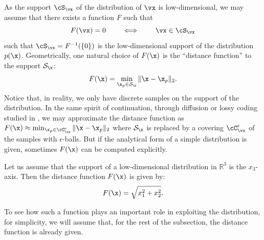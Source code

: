 \documentclass[../../book-main.tex]{subfiles}
\begin{document}
As the support \(\cS_{\vx}\) of the distribution of \(\vx\) is
low-dimensional, we may assume that there exists a function \(F\) such that
\begin{equation}
    F(\vx) = {0} \qquad \iff \qquad \vx \in \cS_{\vx}
\end{equation}
such that \(\cS_{\vx} = F^{-1}(\{0\})\) is the low-dimensional
support of the distribution $p(\x)$. Geometrically, one natural
choice of $F(\x)$ is the ``distance function'' to the support
$\mathcal{S}_{\x}$:
\begin{equation}
    F(\x) = \min_{\x_p \in \mathcal{S}_{\x}} \|\x - \x_p\|_2.
    \label{eqn:F-definition}
\end{equation}
Notice that, in reality, we only have discrete samples on the support
of the distribution. In the same spirit of continuation, through
diffusion or lossy coding studied in
, we may approximate the distance
function as $F(\x) \approx \min_{\x_p \in \cC_{\vx}^{\epsilon}} \|\x
- \x_p\|_2$ where $\mathcal{S}_{\x}$ is replaced by a covering
\(\cC_{\vx}^{\epsilon}\) of the samples with $\epsilon$-balls. But if
the analytical form of a simple distribution is given, sometimes
$F(\x)$ can be computed explicitly.
\begin{example}
    Let us assume that the support of a low-dimensional distribution
    in $\mathbb{R}^3$ is the $x_3$-axis. Then the distance function
    $F(\x)$ is given by:
    \begin{equation}
        F(\x) = \sqrt{x_1^2 + x_2^2}.
    \end{equation}
    \label{eg:distance-line}
\end{example}
To see how such a function plays an important role in exploiting the
distribution, for simplicity, we will assume that, for the rest of
the subsection, the distance function is already given.
\end{document}
